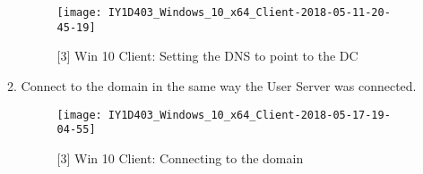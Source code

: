 \begin{enumerate}[series=task3methodology1]
\begin{enumerate}[label=(\alph*)]
        \begin{figure}[H]
          \centering
          \captionsetup{skip=2pt}
          \texttt{[image: IY1D403\_Windows\_10\_x64\_Client-2018-05-11-20-45-19]}
          \caption{[3] Win 10 Client: Setting the DNS to point to the DC}
          \label{fig:task3:win10client_03}
        \end{figure}
      \item Connect to the domain in the same way the User Server was connected.
        \begin{figure}[H]
          \centering
          \captionsetup{skip=2pt}
          \texttt{[image: IY1D403\_Windows\_10\_x64\_Client-2018-05-17-19-04-55]}
          \caption{[3] Win 10 Client: Connecting to the domain}
          \label{fig:task3:win10client_04}
        \end{figure}
    \end{enumerate}
\end{enumerate}

